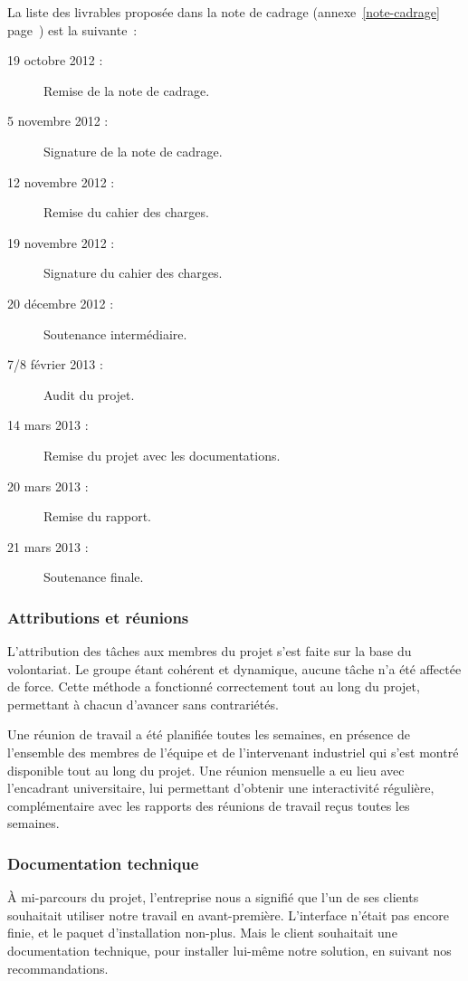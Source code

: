 La liste des livrables proposée dans la note de cadrage (annexe~\ref{note-cadrage} page~\pageref{note-cadrage}) est la suivante~:

\begin{description}
\item[19 octobre 2012 :] Remise de la note de cadrage.
\item[5 novembre 2012 :] Signature de la note de cadrage.
\item[12 novembre 2012 :] Remise du cahier des charges.
\item[19 novembre 2012 :] Signature du cahier des charges.
\item[20 décembre 2012 :] Soutenance intermédiaire.
\item[7/8 février 2013 :] Audit du projet.
\item[14 mars 2013 :] Remise du projet avec les documentations.
\item[20 mars 2013 :] Remise du rapport.
\item[21 mars 2013 :] Soutenance finale.
\end{description}

\subsubsection{Attributions et réunions}

L'attribution des tâches aux membres du projet s'est faite sur la base du volontariat. Le groupe étant cohérent et dynamique, aucune tâche n'a été affectée de force. Cette méthode a fonctionné correctement tout au long du projet, permettant à chacun d'avancer sans contrariétés.

Une réunion de travail a été planifiée toutes les semaines, en présence de l'ensemble des membres de l'équipe et de l'intervenant industriel qui s'est montré disponible tout au long du projet. Une réunion mensuelle a eu lieu avec l'encadrant universitaire, lui permettant d'obtenir une interactivité régulière, complémentaire avec les rapports des réunions de travail reçus toutes les semaines.

\subsubsection{Documentation technique}

À mi-parcours du projet, l'entreprise nous a signifié que l'un de ses clients souhaitait utiliser notre travail en avant-première. L'interface n'était pas encore finie, et le paquet d'installation non-plus. Mais le client souhaitait une documentation technique, pour installer lui-même notre solution, en suivant nos recommandations.

